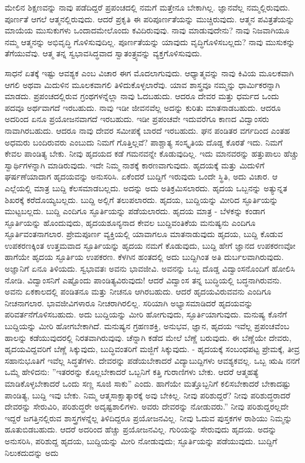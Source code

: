 ಮೇಲಿನ ಶಿಕ್ಷಣವನ್ನು ನಾವು ಪಡೆದಿದ್ದರೆ ಪ್ರಪಂಚದಲ್ಲಿ ನಮಗೆ ಮತ್ತೇನೂ ಬೇಕಾಗಿಲ್ಲ. ಜ್ಞಾನವೆಲ್ಲ ನಮ್ಮಲ್ಲಿರುವುದು. ಪೂರ್ಣತೆ ಆಗಲೆ ಆತ್ಮನಲ್ಲಿರುವುದು. ಆದರೆ ಪ್ರಕೃತಿ ಈ ಪರಿಪೂರ್ಣತೆಯನ್ನು ಮುಚ್ಚಿರುವುದು. ಆತ್ಮನ ಪವಿತ್ರತೆಯನ್ನು ಮಾಯೆಯ ಮುಸುಕುಗಳು ಒಂದಾದಮೇಲೊಂದು ಕವಿದಿರುವುವು. ನಾವು ಮಾಡುವುದೇನು? ನಾವು ನಿಜವಾಗಿಯೂ ನಮ್ಮ ಆತ್ಮನನ್ನು ಅಭಿವೃದ್ಧಿ ಗೊಳಿಸುವುದಿಲ್ಲ. ಪೂರ್ಣತೆಯನ್ನು ಯಾವುದು ವೃದ್ಧಿಗೊಳಿಸಬಲ್ಲದು? ನಾವು ಮುಸುಕನ್ನು ತೆಗೆಯುವೆವು. ಆತ್ಮ ತನ್ನ ಸ್ವಭಾವಸಿದ್ಧವಾದ ಸ್ವಾತಂತ್ರ್ಯವನ್ನು ವ್ಯಕ್ತಗೊಳಿಸುವುದು.

ಸಾಧನೆ ಏತಕ್ಕೆ ಇಷ್ಟು ಆವಶ್ಯಕ ಎಂಬ ವಿಚಾರ ಈಗ ಮೊದಲಾಗುವುದು. ಆಧ್ಯಾತ್ಮವನ್ನು ನಾವು ಕಿವಿಯ ಮೂಲಕವಾಗಿ ಆಗಲಿ ಅಥವಾ ಮಿದುಳಿನ ಮೂಲಕವಾಗಲಿ ತಿಳಿದುಕೊಳ್ಳಲಾರೆವು. ಯಾವ ಶಾಸ್ತ್ರವೂ ನಮ್ಮನ್ನು ಧಾರ್ಮಿಕರನ್ನಾಗಿ ಮಾಡದು. ಪ್ರಪಂಚದಲ್ಲಿರುವ ಗ್ರಂಥಗಳನ್ನೆಲ್ಲಾ ನಾವು ಓದಬಹುದು. ಆದರೂ ದೇವರ ಮತ್ತು ಧರ್ಮದ ಒಂದು ಪದವೂ ಅರ್ಥವಾಗದೆ ಇರಬಹುದು. ನಾವು ಇಡೀ ಜೀವನವೆಲ್ಲ ಅದನ್ನು ಕುರಿತು ಮಾತನಾಡಬಹುದು. ಆದರೂ ಅದರಿಂದ ಏನೂ ಪ್ರಯೋಜನವಾಗದೆ ಇರಬಹುದು. ಇಡೀ ಪ್ರಪಂಚವೇ ಇದುವರೆಗೂ ಕಾಣದ ವಿದ್ವಾಂಸರು ನಾವಾಗಿರಬಹುದು. ಆದರೂ ನಾವು ದೇವರ ಸಮೀಪಕ್ಕೆ ಬಾರದೆ ಇರಬಹುದು. ಘನ ಪಂಡಿತರ ವರ್ಗದಿಂದ ಎಂತಹ ಅಧಮರು ಬಂದಿರುವರು ಎಂಬುದು ನಿಮಗೆ ಗೊತ್ತಿಲ್ಲವೆ? ಪಾಶ್ಚಾತ್ಯ ಸಂಸ್ಕೃತಿಯ ದೊಡ್ಡ ಕೊರತೆ ಇದು. ನಿಮಗೆ ಕೇವಲ ಪಾಂಡಿತ್ಯ ಬೇಕು. ನೀವು ಹೃದಯದ ಕಡೆ ಗಮನವನ್ನೇ ಕೊಡುವುದಿಲ್ಲ. ಇದು ಮಾನವರನ್ನು ಹತ್ತುಪಾಲು ಹೆಚ್ಚು ಸ್ವಾರ್ಥಿಗಳನ್ನಾಗಿ ಮಾಡಿರುವುದು. ಇದೇ ನಿಮ್ಮ ನಾಶಕ್ಕೆ ಕಾರಣವಾಗುವುದು. ಹೃದಯಕ್ಕೆ ಮತ್ತು ಮಿದುಳಿಗೆ ಘರ್ಷಣೆಯಾದಾಗ ಹೃದಯವನ್ನು ಅನುಸರಿಸಿ. ಏಕೆಂದರೆ ಬುದ್ದಿಗೆ ಇರುವುದು ಒಂದೇ ಸ್ಥಿತಿ, ಅದು ವಿಚಾರ. ಆ ಎಲ್ಲೆಯಲ್ಲಿ ಮಾತ್ರ ಬುದ್ದಿ ಕೆಲಸಮಾಡಬಲ್ಲದು. ಅದನ್ನು ಅದು ಅತಿಕ್ರಮಿಸಲಾರದು. ಹೃದಯ ಒಬ್ಬನನ್ನು ಅತ್ಯುನ್ನತ ಶಿಖರಕ್ಕೆ ಕರೆದೊಯ್ಯಬಲ್ಲದು. ಬುದ್ದಿ ಅಲ್ಲಿಗೆ ತಲುಪಲಾರದು. ಹೃದಯ, ಬುದ್ದಿಯನ್ನು ಮೀರಿದ ಸ್ಫೂರ್ತಿಯನ್ನು ಮುಟ್ಟಬಲ್ಲದು. ಬುದ್ದಿ ಎಂದಿಗೂ ಸ್ಫೂರ್ತಿಯನ್ನು ಪಡೆಯಲಾರದು. ಹೃದಯ ಮಾತ್ರ - ಬೆಳಕನ್ನು ಕಂಡಾಗ ಸ್ಫೂರ್ತಿಯನ್ನು ಹೊಂದುವುದು, ಹೃದಯಶೂನ್ಯನಾದ ಕೇವಲ ಬುದ್ದಿವಂತಿಕೆಯ ಮನುಷ್ಯನು ಎಂದಿಗೂ ಸ್ಫೂರ್ತಿವಂತನಾಗಲಾರ. ಪ್ರೇಮಪೂರ್ಣ ವ್ಯಕ್ತಿಯಲ್ಲಿ ಯಾವಾಗಲೂ ಮಾತನಾಡುವುದು ಹೃದಯ, ಬುದ್ದಿ ಕೊಡುವ ಉಪಕರಣಕ್ಕಿಂತ ಉತ್ತಮವಾದ ಸ್ಫೂರ್ತಿಯನ್ನು ಹೃದಯ ನಮಗೆ ಕೊಡುವುದು, ಬುದ್ದಿ ಹೇಗೆ ಜ್ಞಾನದ ಉಪಕರಣವೋ ಹಾಗೆಯೇ ಹೃದಯ ಸ್ಫೂರ್ತಿಯ ಉಪಕರಣ. ಕೆಳಗಿನ ಹಂತದಲ್ಲಿ ಅದು ಬುದ್ದಿಗಿಂತ ಅತಿ ದುರ್ಬಲವಾಗಿರುವುದು. ಅಜ್ಞಾನಿಗೆ ಏನೂ ತಿಳಿಯದು. ಸ್ವಭಾವತಃ ಅವನು ಭಾವಜೀವಿ. ಅವನನ್ನು ಒಬ್ಬ ದೊಡ್ಡ ವಿದ್ವಾಂಸನೊಂದಿಗೆ ಹೋಲಿಸಿ ನೋಡಿ. ವಿದ್ವಾಂಸನಿಗೆ ಎಷ್ಟೊಂದು ಪಾಂಡಿತ್ಯವಿರುವುದು! ಆದರೆ ವಿದ್ವಾಂಸ ತನ್ನ ಬುದ್ಧಿಯಲ್ಲಿ ಬದ್ಧನಾಗಿರುವನು. ಅವನು ಏಕಕಾಲದಲ್ಲಿ ಪಂಡಿತನೂ ಮತ್ತು ನೀಚನೂ ಆಗಿರಬಹುದು. ಆದರೆ ಹೃದಯವಿರುವವನು ಎಂದಿಗೂ ನೀಚನಾಗಲಾರ. ಭಾವಜೀವಿಗಳಾರೂ ನೀಚರಾಗಿರಲಿಲ್ಲ. ಸರಿಯಾಗಿ ಅಭ್ಯಾಸಮಾಡಿದರೆ ಹೃದಯವನ್ನು ಪರಿವರ್ತನೆಗೊಳಿಸಬಹುದು. ಅದು ಬುದ್ದಿಯನ್ನು ಮೀರಿ ಹೋಗುವುದು, ಸ್ಫೂರ್ತಿಯಾಗುವುದು. ಮನುಷ್ಯ ಕೊನೆಗೆ ಬುದ್ದಿಯನ್ನು ಮೀರಿ ಹೋಗಬೇಕಾಗಿದೆ. ಮನುಷ್ಯನ ಗ್ರಹಣಶಕ್ತಿ, ಅನುಭವ, ಜ್ಞಾನ, ಹೃದಯ ಇವೆಲ್ಲ ಪ್ರಪಂಚವೆಂಬ ಹಾಲನ್ನು ಕಡೆಯುವುದರಲ್ಲಿ ನಿರತವಾಗಿರುವುವು. ಚೆನ್ನಾಗಿ ಕಡೆದ ಮೇಲೆ ಬೆಣ್ಣೆ ಬರುವುದು. ಈ ಬೆಣ್ಣೆಯೇ ದೇವರು, ಹೃದಯವಿದ್ದವರಿಗೆ ಬೆಣ್ಣೆ ಸಿಕ್ಕುವುದು, ಬುದ್ಧಿವಂತರಿಗೆ ಮಜ್ಜಿಗೆ ಸಿಕ್ಕುವುದು. - ಹೃದಯಕ್ಕೆ ಸಂಬಂಧಪಟ್ಟ ಪ್ರೇಮಕ್ಕೆ, ತೀವ್ರ ಸಹಾನುಭೂತಿಗೆ ಇವೆಲ್ಲ ಸಿದ್ಧತೆಗಳು. ದೇವರನ್ನು ಪಡೆಯಬೇಕಾದರೆ ವಿದ್ಯಾಬುದ್ದಿಗಳು ಆವಶ್ಯಕವಲ್ಲ. ಒಬ್ಬ ಋಷಿ ನನಗೆ ಒಮ್ಮೆ ಹೇಳಿದನು: ''ಇತರರನ್ನು ಕೊಲ್ಲಬೇಕಾದರೆ ಒಬ್ಬನಿಗೆ ಕತ್ತಿ ಗುರಾಣಿಗಳು ಬೇಕು. ಆದರೆ ಆತ್ಮಹತ್ಯೆ ಮಾಡಿಕೊಳ್ಳಬೇಕಾದರೆ ಒಂದು ಸಣ್ಣ ಸೂಜಿ ಸಾಕು” ಎಂದು. ಹಾಗೆಯೇ ಮತ್ತೊಬ್ಬನಿಗೆ ಕಲಿಸಬೇಕಾದರೆ ಬೇಕಾದಷ್ಟು ಪಾಂಡಿತ್ಯ, ಬುದ್ದಿ ಇವು ಬೇಕು. ನಿಮ್ಮ ಆತ್ಮಸಾಕ್ಷಾತ್ಕಾರಕ್ಕೆ ಅವು ಬೇಕಿಲ್ಲ. ನೀವು ಪರಿಶುದ್ದರೆ? ನೀವು ಪರಿಶುದ್ಧರಾದರೆ ದೇವರನ್ನು ಸೇರುವಿರಿ, ಪರಿಶುದ್ಧರೇ ಅದೃಷ್ಟಶಾಲಿಗಳು. ಅವರು ದೇವರನ್ನು ನೋಡುವರು.” ನೀವು ಪರಿಶುದ್ದರಲ್ಲದೇ ಇದ್ದರೆ ಜಗತ್ತಿನಲ್ಲಿರುವ ಶಾಸ್ತ್ರಗಳನ್ನೆಲ್ಲ ತಿಳಿದಿದ್ದರೂ ಪ್ರಯೋಜನವಿಲ್ಲ. ನೀವು ಓದುವ ಪುಸ್ತಕಗಳ ರಾಶಿಯು ನಿಮ್ಮನ್ನು ಹೂತುಬಿಡಬಹುದು. ಆದರೆ ಅದರಿಂದ ಹೆಚ್ಚು ಪ್ರಯೋಜನವಿಲ್ಲ. ಗುರಿಯನ್ನು ಸೇರುವುದು ಹೃದಯ. ಅದನ್ನು ಅನುಸರಿಸಿ, ಪರಿಶುದ್ದ ಹೃದಯ, ಬುದ್ದಿಯನ್ನು ಮೀರಿ ನೋಡುವುದು; ಸ್ಫೂರ್ತಿಯನ್ನು ಪಡೆಯುವುದು. ಬುದ್ದಿಗೆ ನಿಲುಕದುದನ್ನು ಅದು 